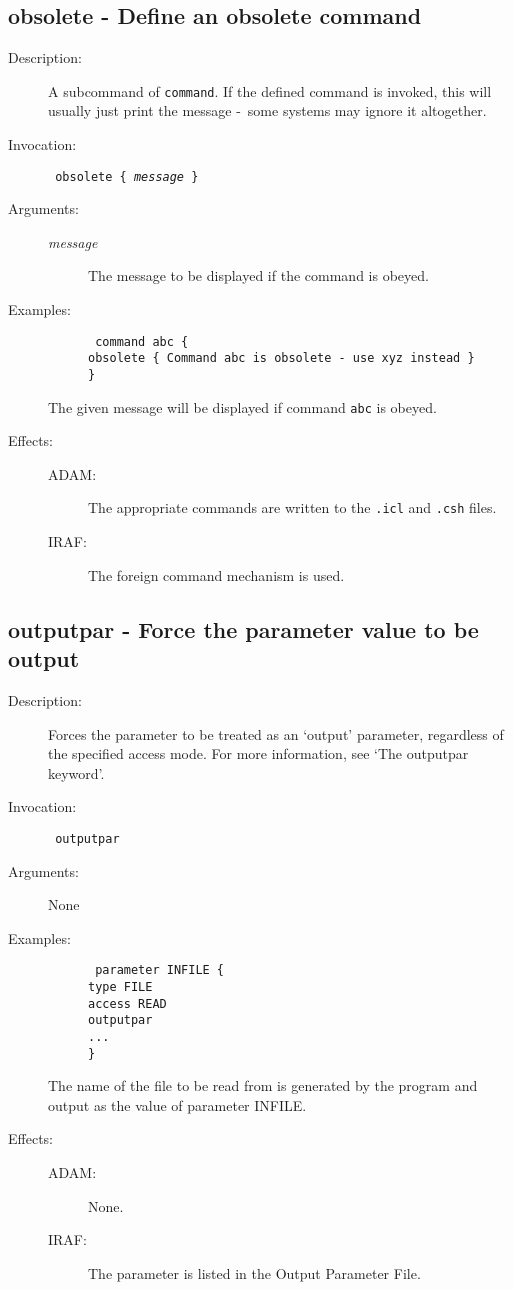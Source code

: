 \documentclass[twoside,11pt]{article}
\newcommand{\htmlref}[2]{#1}
\newcommand{\xlabel}[1]{}
\newcommand{\dash}{--}
\newcommand{\tab}{\>}
\renewcommand{\dash}{-}
\renewcommand{\tab}{   }
\newlength{\sstbannerlength}
\newlength{\sstcaptionlength}
\newlength{\sstexampleslength}
\newlength{\sstexampleswidth}
\newcommand{\sstroutine}[3]{
   \goodbreak
   \rule{\textwidth}{0.5mm}
   \vspace{-7ex}
   \newline
   \settowidth{\sstbannerlength}{{\Large {\bf #1}}}
   \setlength{\sstcaptionlength}{\textwidth}
   \setlength{\sstexampleslength}{\textwidth}
   \addtolength{\sstbannerlength}{0.5em}
   \addtolength{\sstcaptionlength}{-2.0\sstbannerlength}
   \addtolength{\sstcaptionlength}{-5.0pt}
   \settowidth{\sstexampleswidth}{{\bf Examples:}}
   \addtolength{\sstexampleslength}{-\sstexampleswidth}
   \parbox[t]{\sstbannerlength}{\flushleft{\Large {\bf #1}}}
   \parbox[t]{\sstcaptionlength}{\center{\Large #2}}
   \parbox[t]{\sstbannerlength}{\flushright{\Large {\bf #1}}}
   \begin{description}
      #3
   \end{description}
}
\newcommand{\sstdescription}[1]{\item[Description:] #1}
\newcommand{\sstinvocation}[1]{\item[Invocation:]\hspace{0.4em}{\tt #1}}
\newcommand{\ssteffects}[1]{
   \item[Effects:] \mbox{} \\
   \vspace{-3.5ex}
   \begin{description}
      #1
   \end{description}
}
\newcommand{\sstarguments}[1]{
   \item[Arguments:] \mbox{} \\
   \vspace{-3.5ex}
   \begin{description}
      #1
   \end{description}
}
\newcommand{\sstargsnone}[0]{\item[{\rm None}]}
\newcommand{\sstexamples}[1]{
   \item[Examples:] \mbox{}
      #1
}
\newcommand{\sstsubsection}[1]{ \item[{#1}] \mbox{} \\}
\newcommand{\sstexamplesubsection}[2]
{   \vspace{-5ex}
\begin{quote} \texttt{\begin{tabbing}
xxx\=xxx\=\kill
#1
\end{tabbing}}
\end{quote}
#2}
\newcommand{\ssttt}{\tt}
\renewcommand{\sstroutine}[3]{
      \subsection{#1\xlabel{#1}-\label{#1}#2}
      \begin{description}
         #3
      \end{description}
   }
\renewcommand{\sstdescription}[1]{\item[Description:]
      \begin{description}
         #1
      \end{description}
   }
\renewcommand{\sstinvocation}[1]{\item[Invocation:]
      \begin{description}
         {\ssttt #1}
      \end{description}
   }
\renewcommand{\ssteffects}[1]{
      \item[Effects:]
      \begin{description}
         #1
      \end{description}
   }
\renewcommand{\sstarguments}[1]{
      \item[Arguments:]
      \begin{description}
         #1
      \end{description}
   }
\renewcommand{\sstexamples}[1]{
      \item[Examples:]
      \begin{description}
         #1
      \end{description}
   }
\renewcommand{\sstsubsection}[1]{\item[{#1}]}
\renewcommand{\sstexamplesubsection}[2]{\item[] {\ssttt #1} \\ \item[#2]}
\begin{document}
\sstroutine{
   obsolete
}{
   Define an obsolete command
}{
   \sstdescription{
      A subcommand of
      \htmlref{\texttt{command}}{command}.
      If the defined command is invoked, this
      will usually just print the message \dash\ some systems may ignore it
      altogether.
   }
   \sstinvocation{
      obsolete \{ \textit{message} \}
   }
   \sstarguments{
      \sstsubsection{
         \textit{message}
      }{
         The message to be displayed if the command is obeyed.
      }
   }
   \sstexamples{
      \sstexamplesubsection{
         command abc \{\\
         \tab obsolete \{ Command abc is obsolete - use xyz instead \}\\
         \}
      }{
         The given message will be displayed if command {\ssttt abc} is
         obeyed.
      }
   }
   \ssteffects{
      \sstsubsection{ADAM:}
         {The appropriate commands are written to the \texttt{.icl} and 
          \texttt{.csh} files.}
      \sstsubsection{IRAF:}{The foreign command mechanism is used.}
   }
}

\sstroutine{
   outputpar
}{
   Force the parameter value to be output
}{
   \sstdescription{
      Forces the parameter to be treated as an `output' parameter, regardless
      of the specified access mode. For more information, see
\htmlref{`The outputpar keyword'}
{outputpar_key}\latexonly{ (Section \ref{outputpar_key})}.
   }
   \sstinvocation{
      outputpar
   }
   \sstarguments{
      \sstargsnone
   }
   \sstexamples{
      \sstexamplesubsection{
         parameter INFILE \{\\
         \tab type FILE\\
         \tab access READ\\
         \tab outputpar\\
         \tab ...\\
         \}
      }{
         The name of the file to be read from is generated by the program
         and output as the value of parameter INFILE.
      }
   }
   \ssteffects{
      \sstsubsection{ADAM:}{None.}
      \sstsubsection{IRAF:}{The parameter is listed in the Output Parameter
                            File.}
   }
}
\end{document}
